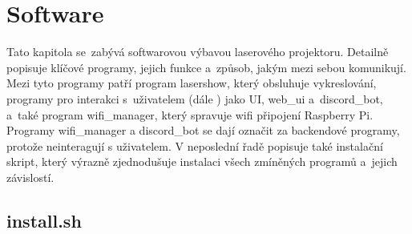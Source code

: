 \chapter{Software}

Tato kapitola se~zabývá softwarovou výbavou laserového projektoru. Detailně popisuje klíčové programy, jejich funkce a~způsob, jakým mezi sebou komunikují.
Mezi tyto programy patří program lasershow, který obsluhuje vykreslování, programy pro interakci s~uživatelem (dále ) jako UI, web\_ui a~discord\_bot, a~také program wifi\_manager, který spravuje wifi připojení Raspberry Pi.
Programy wifi\_manager a discord\_bot se dají označit za backendové programy, protože neinteragují s uživatelem. V neposlední řadě popisuje také instalační skript, který výrazně zjednodušuje instalaci všech zmíněných programů a~jejich závislostí.










\section{install.sh}
